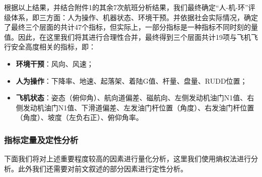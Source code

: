 \documentclass{MathorCupModeling}
\begin{document}
	根据以上结果，并结合附件1的其余7次航班分析结果，我们最终确定“人-机-环”评级体系，即三方面：人为操作、机器状态、环境干预。并依据社会实际情况，确定了最终三个层面的共计47个指标，但实际上，一部分指标是一种指标不同时刻的量值。因此，在这里我们将其进行合理性合并，最终得到三个层面共计19项与飞机飞行安全高度相关的指标，即：
	\begin{itemize}
		\item \textbf{环境干预}：风向、风速；
		\item \textbf{人为操作}：下降率、地速、起落架、着陆G值、杆量、盘量、RUDD位置；
		\item \textbf{飞机状态}：姿态（俯仰角）、航向道偏差、磁航向、左侧发动机油门N1值、右侧发动机油门N1值、下滑道偏差、左发油门杆位置（角度）、右发油门杆位置（角度）、坡度（左负右正）、俯仰角率。
	\end{itemize}

	\subsubsection{指标定量及定性分析}
	下面我们将对上述重要程度较高的因素进行量化分析，这里我们使用熵权法进行分析。此外我们还需要对前文叙述的部分因素进行定性分析。
\end{document}
